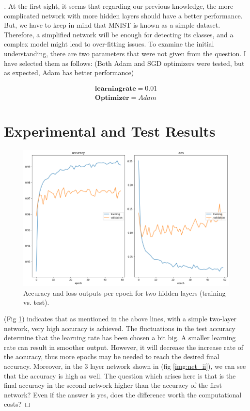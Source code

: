 \documentclass[12pt,oneside,geqno]{article}
\begin{document}
\begin{proof}[\color{red}{Solution}]
		At the first sight, it seems that regarding our previous knowledge, the more complicated network with more hidden layers should have a better performance. But, we have to keep in mind that MNIST is known as a simple dataset. Therefore, a simplified network will be enough for detecting its classes, and a complex model might lead to over-fitting issues. To examine the initial understanding, there are two parameters that were not given from the question. I have selected them as follows: (Both Adam and SGD optimizers were tested, but as expected, Adam has better performance)
		
		\begin{align}
			\mathbf{learning rate} = 0.01 \\
			\mathbf{Optimizer} = Adam
		\end{align}
		
		\section{Experimental and Test Results}
		\begin{figure}
			\centering
			\includegraphics[width=\textwidth]{../figs/net_i.png}
			\caption{Accuracy and loss outputs per epoch for two hidden layers (training vs. test).}
			\label{img:net_i}
		\end{figure}
		
		(Fig \ref{img:net_i}) indicates that as mentioned in the above lines, with a simple two-layer network, very high accuracy is achieved. The fluctuations in the test accuracy determine that the learning rate has been chosen a bit big. A smaller learning rate can result in smoother output. However, it will decrease the increase rate of the accuracy, thus more epochs may be needed to reach the desired final accuracy. Moreover, in the 3 layer network shown in (fig \ref{img:net_ii}), we can see that the accuracy is high as well. The question which arises here is that is the final accuracy in the second network higher than the accuracy of the first network? Even if the answer is yes, does the difference worth the computational costs? 
		

\end{proof}
\end{document}
